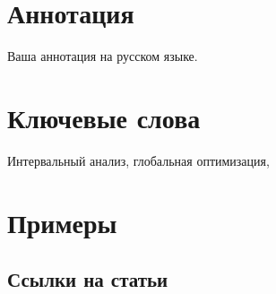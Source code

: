 \documentclass[a4paper,12pt]{extarticle}
\begin{document}
\newpage
\setcounter{page}{2}

{
	\hypersetup{linkcolor=black}
	\tableofcontents
}

\newpage

\newpage
\section*{Аннотация}   %
Ваша аннотация на русском языке.


\section*{Ключевые слова}
Интервальный анализ, глобальная оптимизация, 
\pagebreak

\section{Примеры} 
\subsection{Ссылки на статьи}

\end{document}

